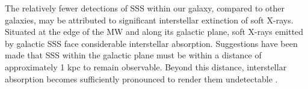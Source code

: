     
    
    
    The relatively fewer detections of SSS within our galaxy, compared to other galaxies, may be attributed to significant interstellar extinction of soft X-rays. Situated at the edge of the MW and along its galactic plane, soft X-rays emitted by galactic SSS face considerable interstellar absorption. Suggestions have been made that SSS within the galactic plane must be within a distance of approximately 1 kpc to remain observable. Beyond this distance, interstellar absorption becomes sufficiently pronounced to render them undetectable \cite{van1992accreting}.
    
